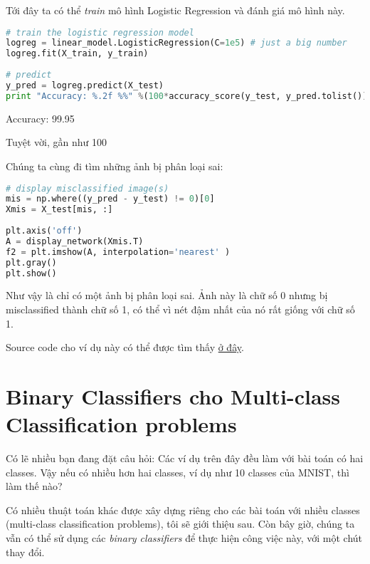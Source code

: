 Tới đây ta có thể \textit{train} mô hình Logistic Regression và đánh giá mô hình này.   
 
\begin{lstlisting}[language=Python]
# train the logistic regression model  
logreg = linear_model.LogisticRegression(C=1e5) # just a big number  
logreg.fit(X_train, y_train) 
 
# predict  
y_pred = logreg.predict(X_test) 
print "Accuracy: %.2f %%" %(100*accuracy_score(y_test, y_pred.tolist())) 
\end{lstlisting}
 
    Accuracy: 99.95 %
 
Tuyệt vời, gần như 100%
 
Chúng ta cùng đi tìm những ảnh bị phân loại sai: 
 
\begin{lstlisting}[language=Python]
# display misclassified image(s) 
mis = np.where((y_pred - y_test) != 0)[0] 
Xmis = X_test[mis, :] 
 
plt.axis('off') 
A = display_network(Xmis.T) 
f2 = plt.imshow(A, interpolation='nearest' ) 
plt.gray() 
plt.show() 
\end{lstlisting}
 
 
Như vậy là chỉ có một ảnh bị phân loại sai. Ảnh này là chữ số 0 nhưng bị misclassified thành chữ số 1, có thể vì nét đậm nhất của nó rất giống với chữ số 1.  
 
Source code cho ví dụ này có thể được tìm thấy \href{http://machinelearningcoban.com/assets/LogReg2/LogReg2.ipynb}{ở đây}. 
 
 
\section{Binary Classifiers cho Multi-class Classification problems }
 
Có lẽ nhiều bạn đang đặt câu hỏi: Các ví dụ trên đây đều làm với bài toán có hai classes. Vậy nếu có nhiều hơn hai classes, ví dụ như 10 classes của MNIST, thì làm thế nào? 
 
Có nhiều thuật toán khác được xây dựng riêng cho các bài toán với nhiều classes (multi-class classification problems), tôi sẽ giới thiệu sau. Còn bây giờ, chúng ta vẫn có thể sử dụng các \textit{binary classifiers} để thực hiện công việc này, với một chút thay đổi.  
 
